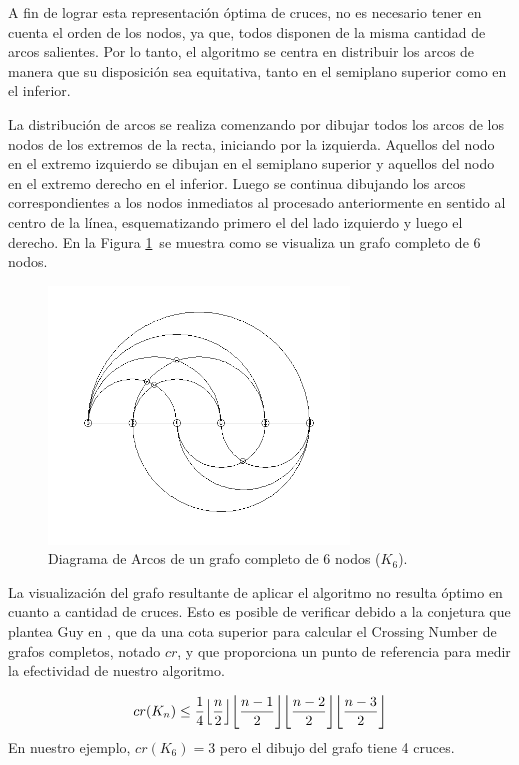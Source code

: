 	A fin de lograr esta representación óptima de cruces, no es necesario tener en cuenta el orden de los nodos, ya que, todos disponen de la misma cantidad de arcos salientes. Por lo tanto, el algoritmo se centra en distribuir los arcos de manera que su disposición sea equitativa, tanto en el semiplano  superior como en el inferior.
	
	La distribución de arcos se realiza comenzando por  dibujar  todos los arcos de los nodos de los extremos de la  recta, iniciando por la izquierda. Aquellos del nodo en el extremo  izquierdo  se dibujan en el semiplano  superior y aquellos del  nodo en el extremo  derecho en el inferior. Luego se continua dibujando los arcos correspondientes a los  nodos inmediatos al  procesado anteriormente en sentido al  centro de la línea, esquematizando primero el del lado izquierdo y luego el derecho. En la Figura \ref{fig:arcdiagram_k6_no_optimo}\ se muestra como  se visualiza  un grafo completo de 6 nodos.
	
	\begin{figure}[h]
		\centering
		\includegraphics[width=8cm]{imagenes/grafo_1_bn.png}
		\caption{Diagrama de Arcos de un grafo completo de 6 nodos ($K_6$).}
		\label{fig:arcdiagram_k6_no_optimo}
	\end{figure}
	
	La  visualización  del grafo resultante de aplicar el algoritmo no resulta óptimo en cuanto a cantidad de cruces. Esto es posible de verificar debido a la conjetura que  plantea Guy en \cite{guy1960combinatorial},  que  da una cota superior para calcular el Crossing Number de grafos completos, notado $cr$,  y que proporciona un punto de referencia para medir la efectividad de nuestro algoritmo.
	
	$$cr(K_n) \leq \frac{1}{4} \floor*{\frac{n}{2}} \floor*{\frac{n-1}{2}} \floor*{\frac{n-2}{2}} \floor*{\frac{n-3}{2}}$$
	En nuestro  ejemplo, $cr(K_6)=3$ pero el dibujo del grafo  tiene 4 cruces.
	
